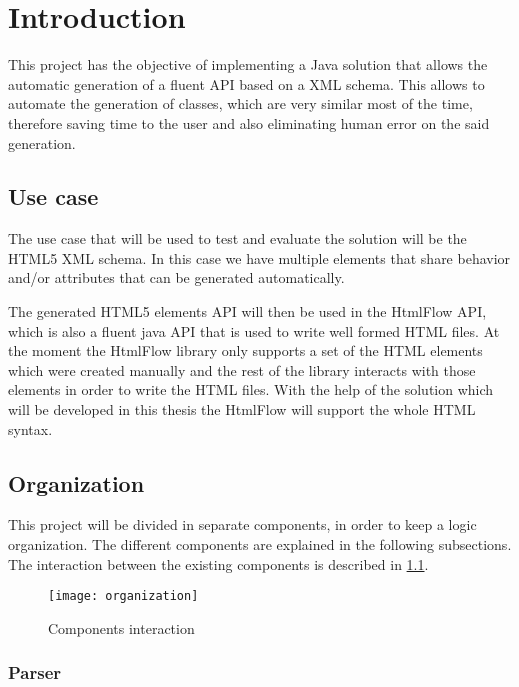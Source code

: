 % 
%  
%
\chapter{Introduction}

This project has the objective of implementing a Java solution that allows the automatic generation of a fluent API based on a XML schema. This allows to automate the generation of classes, which are very similar most of the time, therefore saving time to the user and also eliminating human error on the said generation.

\section{Use case}

The use case that will be used to test and evaluate the solution will be the HTML5 XML schema. In this case we have multiple elements that share behavior and/or attributes that can be generated automatically.

\noindent
The generated HTML5 elements API will then be used in the HtmlFlow API, which is also a fluent java API that is used to write well formed HTML files. At the moment the HtmlFlow library only supports a set of the HTML elements which were created manually and the rest of the library interacts with those elements in order to write the HTML files. With the help of the solution which will be developed in this thesis the HtmlFlow will support the whole HTML syntax.

\section{Organization}

This project will be divided in separate components, in order to keep a logic organization. The different components are explained in the following subsections. The interaction between the existing components is described in \ref{ComponentInteraction}.

\begin{figure}[ht]
	\centering
	\texttt{[image: organization]}
	\caption{Components interaction}
	\label{ComponentInteraction}
\end{figure}

\subsection{Parser}

